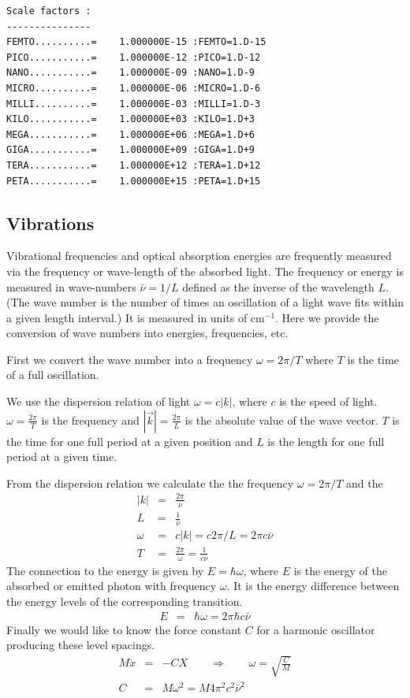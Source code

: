 \documentclass[final,12pt]{article}
\begin{document}
{{{{{{\begin{verbatim}
Scale factors :
---------------
FEMTO..........=    1.000000E-15 :FEMTO=1.D-15
PICO...........=    1.000000E-12 :PICO=1.D-12
NANO...........=    1.000000E-09 :NANO=1.D-9
MICRO..........=    1.000000E-06 :MICRO=1.D-6
MILLI..........=    1.000000E-03 :MILLI=1.D-3
KILO...........=    1.000000E+03 :KILO=1.D+3
MEGA...........=    1.000000E+06 :MEGA=1.D+6
GIGA...........=    1.000000E+09 :GIGA=1.D+9
TERA...........=    1.000000E+12 :TERA=1.D+12
PETA...........=    1.000000E+15 :PETA=1.D+15
\end{verbatim}

\newpage
\subsection{Vibrations}

Vibrational frequencies and optical absorption energies are frequently
measured via the frequency or wave-length of the absorbed light. The
frequency or energy is measured in wave-numbers $\bar{\nu}=1/L$
defined as the inverse of the wavelength $L$. (The wave number is the
number of times an oscillation of a light wave fits within a given
length interval.) It is measured in units of cm$^{-1}$. Here we
provide the conversion of wave numbers into energies, frequencies,
etc.


First we convert the wave number into a frequency $\omega=2\pi/T$ where $T$ is
the time of a full oscillation. 

We use the dispersion relation of light $\omega=c|k|$, where $c$ is the speed
of light. $\omega=\frac{2\pi}{T}$ is the frequency and
$|\vec{k}|=\frac{2\pi}{L}$ is the absolute value of the wave vector. $T$ is the
time for one full period at a given position and $L$ is the length for one
full period at a given time.

From the dispersion relation we calculate the 
the frequency $\omega=2\pi/T$ and the 
\begin{eqnarray}
|k|&=&\frac{2\pi}{\bar{\nu}}
\label{eq:kofbarnu}
\\
L&=&\frac{1}{\bar{\nu}}
\label{eq:wavelengthofbarnu}
\\
\omega&=&c|k|=c2\pi/L=2\pi c\bar{\nu}
\label{eq:omegaofbarnu}
\\
T&=&\frac{2\pi}{\omega}=\frac{1}{c\bar{\nu}}
\label{eq:periodofbarnu}
\end{eqnarray}
The connection to the energy is given by $E=\hbar\omega$, where $E$ is the
energy of the absorbed or emitted photon with frequency $\omega$. It is the
energy difference between the energy levels of the corresponding transition.
\begin{eqnarray}
E&=&\hbar\omega=2\pi\hbar c\bar{\nu}
\label{eq:eofomega}
\end{eqnarray}
Finally we would like to know the force constant $C$ for a harmonic oscillator
producing these level spacings. 
\begin{eqnarray}
M\ddot{x}&=&-CX
\qquad\Rightarrow\qquad \omega= \sqrt{\frac{C}{M}}
\nonumber\\
C&=&M\omega^2=M4\pi^2c^2\bar{\nu}^2
\end{eqnarray}

}}}}}}
\end{document}
